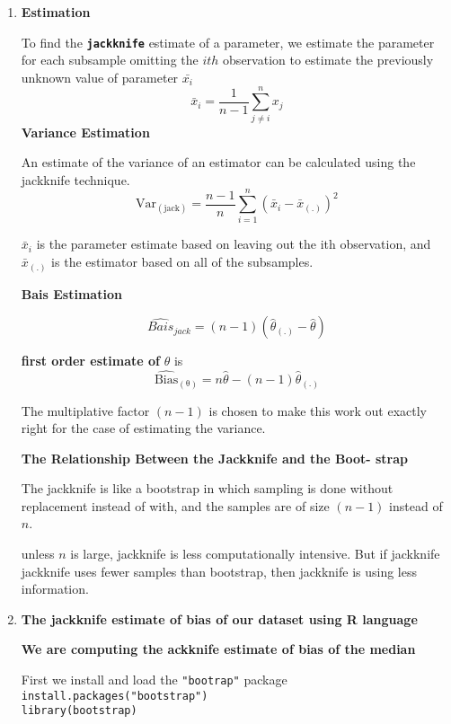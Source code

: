 \documentclass{article}[12pt]
\begin{document}
\begin{enumerate}
\item %
{\bf Estimation}

To find the {\bf \verb|jackknife|} estimate of a parameter, we estimate the parameter for each subsample omitting the $ith$ observation to estimate the previously unknown value of parameter $\bar{x_i}$
$$ \bar{x}_i = \frac{1}{n-1}\sum_{j\neq i}^{n} x_j $$
\bigskip
{\bf Variance Estimation}

An estimate of the variance of an estimator can be calculated using the jackknife technique.
$$ \mathrm{Var_{(jack)}} = \frac{n-1}{n} \sum_{i=1}^{n}(\bar{x}_{i} - \bar{x}_\mathrm{(.)})^{2}   $$

 $\bar{x}_i$ is the parameter estimate based on leaving out the ith observation, and $\bar{x}_\mathrm{(.)}$ is the estimator based on all of the subsamples.

\bigskip
{\bf Bais Estimation}


$$\widehat{Bais}_{jack} =(n-1)(\hat{\theta}_{(.)} - \hat{\theta})  $$


{\bf first order estimate of } $\theta$ is 
$$   \widehat{\text{Bias}}_\mathrm{(\theta)}=n\hat{\theta} - (n-1)\hat{\theta}_\mathrm{(.)} $$

The  multiplative factor $(n-1)$ is chosen to make this work out exactly right for the case of estimating the variance. \cite{Kate}

\bigskip 
{\bf \large The Relationship Between the Jackknife and the Boot-
strap}

The jackknife is like a bootstrap in which sampling is done without replacement
instead of with, and the samples are of size $(n − 1)$ instead of $n$.

\bigskip

unless $n$ is large, jackknife is less computationally intensive. But if jackknife jackknife uses fewer samples than bootstrap, then jackknife is using less information. 

\item %
{\bf \large  The jackknife estimate of bias of our dataset using R language }


{\bf We are computing the ackknife estimate of bias of the median }

\bigskip
First we install and load the \verb|"bootrap"| package \\

\verb|install.packages("bootstrap")|\\
\verb|library(bootstrap)| \\


\end{enumerate}
\end{document}

